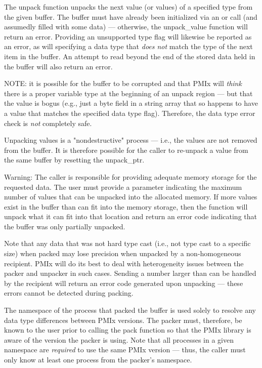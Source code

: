 \descr

The unpack function unpacks the next value (or values) of a specified type from the given buffer. The buffer must have already been initialized via an  or  call (and assumedly filled with some data) --- otherwise, the unpack_value function will return an error. Providing an unsupported type flag will likewise be reported as an error, as will specifying a data type that \textit{does not} match the type of the next item in the buffer. An attempt to read beyond the end of the stored data held in the buffer will also return an error.

NOTE: it is possible for the buffer to be corrupted and that \ac{PMIx} will \textit{think} there is a proper variable type at the beginning of an unpack region --- but that the value is bogus (e.g., just a byte field in a string array that so happens to have a value that matches the specified data type flag). Therefore, the data type error check is \textit{not} completely safe.

Unpacking values is a "nondestructive" process --- i.e., the values are not removed from the buffer. It is therefore possible for the caller to re-unpack a value from the same buffer by resetting the unpack_ptr.

Warning: The caller is responsible for providing adequate memory storage for the requested data. The user must provide a parameter indicating the maximum number of values that can be unpacked into the allocated memory. If more values exist in the buffer than can fit into the memory storage, then the function will unpack what it can fit into that location and return an error code indicating that the buffer was only partially unpacked.

Note that any data that was not hard type cast (i.e., not type cast to a specific size) when packed may lose precision when unpacked by a non-homogeneous recipient. \ac{PMIx} will do its best to deal with heterogeneity issues between the packer and unpacker in such cases. Sending a number larger than can be handled by the recipient will return an error code generated upon unpacking --- these errors cannot be detected during packing.

The namespace of the process that packed the buffer is used solely to resolve any data type
differences between \ac{PMIx} versions. The packer must, therefore, be
known to the user prior to calling the pack function so that the
\ac{PMIx} library is aware of the version the packer is using. Note that
all processes in a given namespace are \textit{required} to use the same \ac{PMIx}
version --- thus, the caller must only know at least one process from the
packer's namespace.


